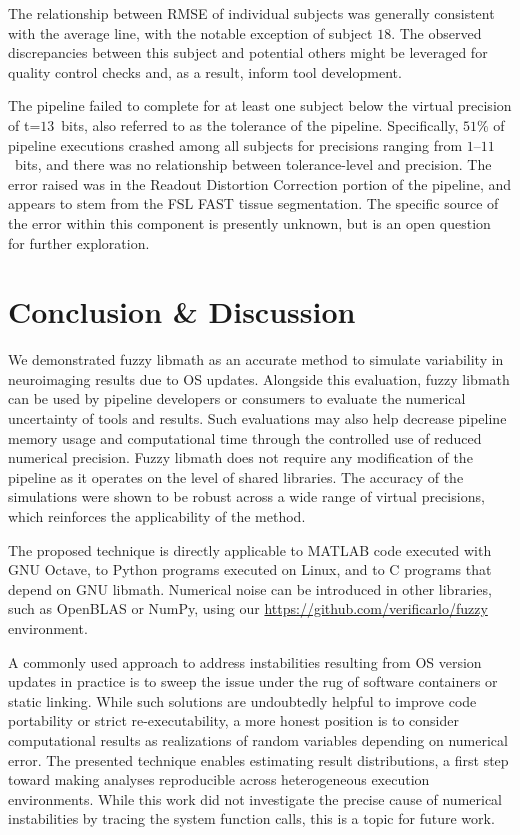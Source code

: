 The relationship between RMSE of individual subjects was generally consistent with the
average line, with the notable exception of subject $18$. The observed discrepancies between
this subject and potential others might be leveraged for quality control checks and, as a
result, inform tool development.

The pipeline failed to complete for at least one subject below the virtual precision of t=$13$~bits, also
referred to as the tolerance of the pipeline.
Specifically, $51\%$ of pipeline executions crashed among all subjects for precisions ranging from $1$--$11$~bits,
and there was no relationship between tolerance-level and precision.
The error raised was in the Readout Distortion Correction portion of the pipeline, and appears to stem from the
FSL FAST tissue segmentation. The specific source of the error within this component is presently unknown, but
is an open question for further exploration.

\section{Conclusion \& Discussion}

We demonstrated fuzzy libmath as an accurate method to simulate variability in neuroimaging results due to OS
updates. Alongside this evaluation, fuzzy libmath can be
used by pipeline developers or consumers to evaluate the numerical uncertainty of tools and results.
 Such evaluations may also help decrease pipeline memory usage and computational time
through the controlled use of reduced numerical precision.
Fuzzy libmath does not require any modification of the pipeline
as it operates on the level of shared libraries. The accuracy of
the simulations were shown to be robust across a wide range of virtual
precisions, which reinforces the applicability of the method.

The proposed technique is directly applicable to MATLAB code executed with GNU Octave, 
to Python programs executed on Linux, and to C programs that depend on GNU libmath.
Numerical noise can be introduced in other libraries, such as OpenBLAS or NumPy, using our \url{https://github.com/verificarlo/fuzzy} environment.

A commonly used approach to address instabilities resulting from OS
version updates in practice is to sweep the issue under the rug of software containers
or static linking. While such solutions are undoubtedly helpful to improve
code portability or strict re-executability, a more honest position is to consider computational
results as realizations of random variables depending on numerical error.
The presented technique enables estimating result distributions, a first
step toward making analyses reproducible across heterogeneous execution
environments. While this work did not investigate the precise cause of
numerical instabilities by tracing the system function calls, this is a topic for future work.

